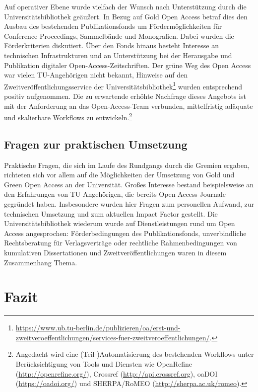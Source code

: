 \documentclass[a4paper,
fontsize=11pt,
oneside,
numbers=noperiodatend,
parskip=half-,
bibliography=totoc,
final
]{scrartcl}
\begin{document}
Auf operativer Ebene wurde vielfach der Wunsch nach Unterstützung durch
die Universitätsbibliothek geäußert. In Bezug auf Gold Open Access
betraf dies den Ausbau des bestehenden Publikationsfonds um
Fördermöglichkeiten für Conference Proceedings, Sammelbände und
Monografien. Dabei wurden die Förderkriterien diskutiert. Über den Fonds
hinaus besteht Interesse an technischen Infrastrukturen und an
Unterstützung bei der Herausgabe und Publikation digitaler
Open-Access-Zeit\-schrif\-ten. Der grüne Weg des Open Access war vielen
TU-Angehörigen nicht bekannt, Hinweise auf den
Zweitveröffentlichungsservice der Universitätsbibliothek\footnote{\url{https://www.ub.tu-berlin.de/publizieren/oa/erst-und-zweitveroeffentlichungen/services-fuer-zweitveroeffentlichungen/}.}
wurden entsprechend positiv aufgenommen. Die zu erwartende erhöhte
Nachfrage dieses Angebots ist mit der Anforderung an das
Open-Access-Team verbunden, mittelfristig adäquate und skalierbare
Workflows zu entwickeln.\footnote{Angedacht wird eine
  (Teil-)Automatisierung des bestehenden Workflows unter
  Berücksichtigung von Tools und Diensten wie OpenRefine
  (\url{http://openrefine.org/}), Crossref
  (\url{http://api.crossref.org}), oaDOI (\url{https://oadoi.org/}) und
  SHERPA/RoMEO (\url{http://sherpa.ac.uk/romeo}).}

\hypertarget{fragen-zur-praktischen-umsetzung}{%
\subsection*{Fragen zur praktischen
Umsetzung}\label{fragen-zur-praktischen-umsetzung}}

Praktische Fragen, die sich im Laufe des Rundgangs durch die Gremien
ergaben, richteten sich vor allem auf die Möglichkeiten der Umsetzung
von Gold und Green Open Access an der Universität. Großes Interesse
bestand beispielsweise an den Erfahrungen von TU-Angehörigen, die
bereits Open-Access-Journale gegründet haben. Insbesondere wurden hier
Fragen zum personellen Aufwand, zur technischen Umsetzung und zum
aktuellen Impact Factor gestellt. Die Universitätsbibliothek wiederum
wurde auf Dienstleistungen rund um Open Access angesprochen:
Förderbedingungen des Publikationsfonds, unverbindliche Rechtsberatung
für Verlagsverträge oder rechtliche Rahmenbedingungen von kumulativen
Dissertationen und Zweitveröffentlichungen waren in diesem Zusammenhang
Thema.

\hypertarget{fazit}{%
\section*{Fazit}\label{fazit}}
\end{document}
